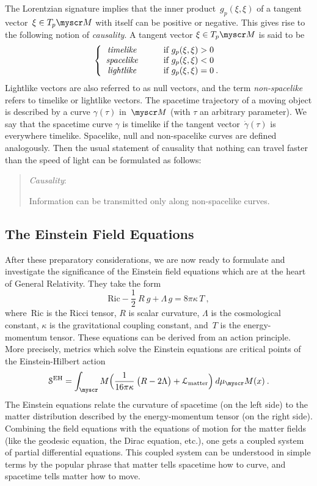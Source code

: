\documentclass[reqno,11pt]{amsart}
\numberwithin{equation}{section}
\newcommand{\beq}{\begin{equation}}
\newcommand{\eeq}{\end{equation}}
\newcommand{\1}{\mbox{\rm 1 \hspace{-1.05 em} 1}}
\renewcommand{\L}{{\mathcal{L}}}
\newcommand{\Sact}{{\mathcal{S}}}
\newcommand{\scrM}{\myscr M}
\begin{document}
The Lorentzian signature implies that the inner product~$g_p(\xi, \xi)$
of a tangent vector~$\xi \in T_p\scrM$ with itself can be positive or negative. This gives rise to the following
notion of {\em{causality}}. A tangent vector $\xi \in T_p\scrM$ is said to be
\beq \label{causalMink}
\left\{ \begin{array}{cll}
{\mbox{\em{timelike}}} &\quad& {\text{if $g_p(\xi, \xi) >0$}} \\
{\mbox{\em{spacelike}}} && {\text{if $g_p(\xi, \xi) <0$}} \\
{\mbox{\em{lightlike}}} && {\text{if $g_p(\xi, \xi) =0$}}\:. \end{array}  \right.
\eeq
Lightlike vectors are also referred to as null vectors, and the term {\em non-spacelike} refers to timelike or lightlike vectors.
The spacetime trajectory of a moving object is described by a curve
$\gamma(\tau)$ in~$\scrM$ (with $\tau$ an arbitrary parameter).
We say that the spacetime curve $\gamma$ is timelike if the tangent vector~$\dot{\gamma}(\tau)$
is everywhere timelike. Spacelike, null and
non-spacelike curves are defined analogously. Then 
the usual statement of causality that nothing
can travel faster than the speed of light can be formulated as follows: 
\medskip
\begin{quote}
{\em{Causality}}: \quad \parbox[t]{8.5cm}{
Information can be transmitted only along
non-space\-like curves.}
\end{quote}\medskip

\subsection{The Einstein Field Equations}
After these preparatory considerations, we are now ready to formulate and investigate the significance of the Einstein field equations which are at the heart of General Relativity. They take the form
\[ %
\text{Ric} - \frac{1}{2}\: R\: g + \Lambda\, g = 8 \pi \kappa\, T \:, \]
where~$\text{Ric}$ is the Ricci tensor, $R$ is scalar curvature, $\Lambda$ is the cosmological constant,
$\kappa$ is the gravitational coupling constant, and~$T$ is the energy-momentum tensor.
These equations can be derived from an action principle. More precisely, metrics which
solve the Einstein equations are critical points of the Einstein-Hilbert action
\beq \label{EH}
\Sact^\text{EH} = \int_\scrM \Big( \frac{1}{16 \pi \kappa}\:\big( R - 2 \Lambda \big) +  \L_{\text{matter}} \Big)\: d\mu_\scrM(x)\:.
\eeq
The Einstein equations relate the curvature of spacetime (on the left side) to the matter distribution
described by the energy-momentum tensor (on the right side).
Combining the field equations with the equations of motion for the matter fields
(like the geodesic equation, the Dirac equation, etc.), one gets a coupled system of partial
differential equations. This coupled system can be understood
in simple terms by the popular phrase
that matter tells spacetime how to curve, and spacetime tells matter how to move.
\end{document}
